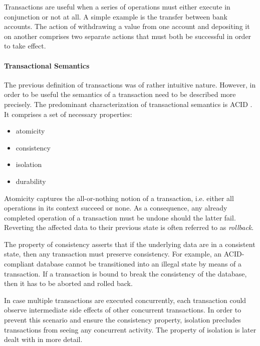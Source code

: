 Transactions are useful when a series of operations must either execute in
conjunction or not at all. A simple example is the transfer between bank
accounts. The action of withdrawing a value from one account and depositing it
on another comprises two separate actions that must both be successful in order
to take effect.



\paragraph{Transactional Semantics}

The previous definition of transactions was of rather intuitive nature. However,
in order to be useful the semantics of a transaction need to be described more
precisely. The predominant characterization of transactional semantics is ACID
\cite{gray1981transaction, haerder1983principles}. It comprises a set of necessary properties:

\begin{itemize}
    \item atomicity
    \item consistency
    \item isolation
    \item durability
\end{itemize}

Atomicity captures the all-or-nothing notion of a transaction, i.e. either all
operations in its context succeed or none. As a consequence, any already
completed operation of a transaction must be undone should the latter fail.
Reverting the affected data to their previous state is often referred to as
\emph{rollback}.

The property of consistency asserts that if the underlying data are in a
consistent state, then any transaction must preserve consistency. For example,
an ACID-compliant database cannot be transitioned into an illegal state by means
of a transaction. If  a transaction is bound to break the consistency of the
database, then it has to be aborted and rolled back.

In case multiple transactions are executed concurrently, each transaction could
observe intermediate side effects of other concurrent transactions. In order to
prevent this scenario and ensure the consistency property, isolation precludes
transactions from seeing any concurrent activity. The property of isolation is
later dealt with in more detail.

